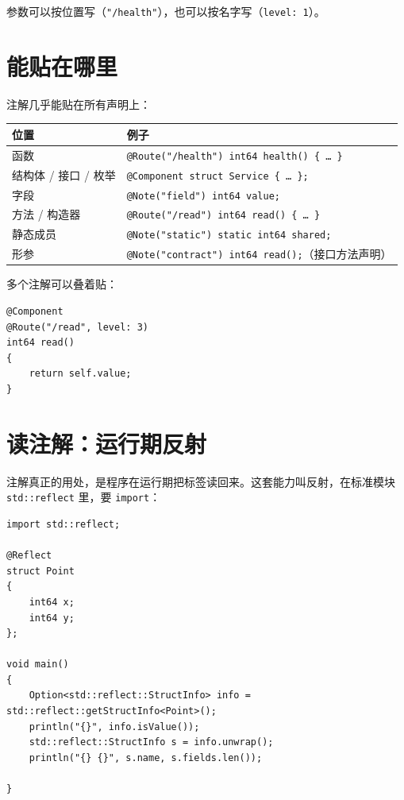 参数可以按位置写（\texttt{"/\allowbreak{}health"}），也可以按名字写（\texttt{level:\allowbreak{} 1}）。

\section{能贴在哪里}

注解几乎能贴在所有声明上：

\begin{center}
\begin{tabular}{ll}
\toprule
位置 & 例子 \\
\midrule
函数 & \texttt{@Route(\allowbreak{}"/\allowbreak{}health")\allowbreak{} int64 health(\allowbreak{})\allowbreak{} \{ … \}} \\
结构体 / 接口 / 枚举 & \texttt{@Component struct Service \{ … \};} \\
字段 & \texttt{@Note(\allowbreak{}"field")\allowbreak{} int64 value;} \\
方法 / 构造器 & \texttt{@Route(\allowbreak{}"/\allowbreak{}read")\allowbreak{} int64 read(\allowbreak{})\allowbreak{} \{ … \}} \\
静态成员 & \texttt{@Note(\allowbreak{}"static")\allowbreak{} static int64 shared;} \\
形参 & \texttt{@Note(\allowbreak{}"contract")\allowbreak{} int64 read(\allowbreak{})\allowbreak{};}（接口方法声明） \\
\bottomrule
\end{tabular}
\end{center}

多个注解可以叠着贴：

\par
\medskip
\begin{lstlisting}[style=chali]
@Component
@Route("/read", level: 3)
int64 read()
{
    return self.value;
}
\end{lstlisting}
\par
\medskip

\section{读注解：运行期反射}

注解真正的用处，是程序在运行期把标签读回来。这套能力叫反射，在标准模块 \texttt{std:\allowbreak{}:\allowbreak{}reflect} 里，要 \texttt{import}：

\par
\medskip
\begin{lstlisting}[style=chali]
import std::reflect;

@Reflect
struct Point
{
    int64 x;
    int64 y;
};

void main()
{
    Option<std::reflect::StructInfo> info = std::reflect::getStructInfo<Point>();
    println("{}", info.isValue());
    std::reflect::StructInfo s = info.unwrap();
    println("{} {}", s.name, s.fields.len());

}
\end{lstlisting}
\par
\medskip


